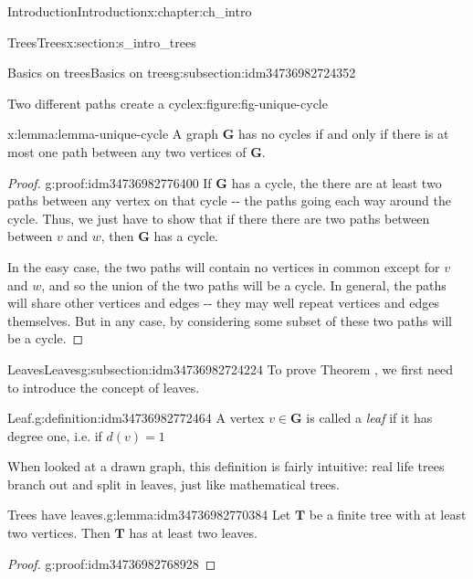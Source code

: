 \documentclass[oneside,10pt,]{book}
\numberwithin{equation}{section}
\newcommand{\bfG}{\mathbf{G}}
\newcommand{\bfT}{\mathbf{T}}
\begin{document}
\begin{chapterptx}{Introduction}{}{Introduction}{}{}{x:chapter:ch_intro}
\begin{sectionptx}{Trees}{}{Trees}{}{}{x:section:s_intro_trees}
\begin{subsectionptx}{Basics on trees}{}{Basics on trees}{}{}{g:subsection:idm34736982724352}
\begin{figureptx}{Two different paths create a cycle}{x:figure:fig-unique-cycle}{}
\begin{image}{0.05}{0.9}{0.05}
{
}%
\end{image}%
\tcblower
\end{figureptx}%
\begin{lemma}{}{}{x:lemma:lemma-unique-cycle}%
A graph \(\bfG\) has no cycles if and only if there is at most one path between any two vertices of \(\bfG\).%
\end{lemma}
\begin{proof}{}{g:proof:idm34736982776400}
If \(\bfG\) has a cycle, the there are at least two paths between any vertex on that cycle -{}-{} the paths going each way around the cycle.  Thus, we just have to show that if there there are two paths between between \(v\) and \(w\), then \(\bfG\) has a cycle.%
\par
In the easy case, the two paths will contain no vertices in common except for \(v\) and \(w\), and so the union of the two paths will be a cycle.  In general, the paths will share other vertices and edges -{}-{} they may well repeat vertices and edges themselves.  But in any case, by considering some subset of these two paths will be a cycle.%
\end{proof}
\end{subsectionptx}
%
%
\typeout{************************************************}
\typeout{************************************************}
%
\begin{subsectionptx}{Leaves}{}{Leaves}{}{}{g:subsection:idm34736982724224}
To prove Theorem , we first need to introduce the concept of leaves.%
\begin{definition}{Leaf.}{g:definition:idm34736982772464}%
A vertex \(v\in\bfG\) is called a \emph{leaf} if it has degree one, i.e. if \(d(v)=1\)%
\end{definition}
When looked at a drawn graph, this definition is fairly intuitive: real life trees branch out and split in leaves, just like mathematical trees.%
\begin{lemma}{Trees have leaves.}{}{g:lemma:idm34736982770384}%
Let \(\bfT\) be a finite tree with at least two vertices.  Then \(\bfT\) has at least two leaves.\end{lemma}
\begin{proof}{}{g:proof:idm34736982768928}

\end{proof}
\end{subsectionptx}
\end{sectionptx}
\end{chapterptx}
\end{document}

